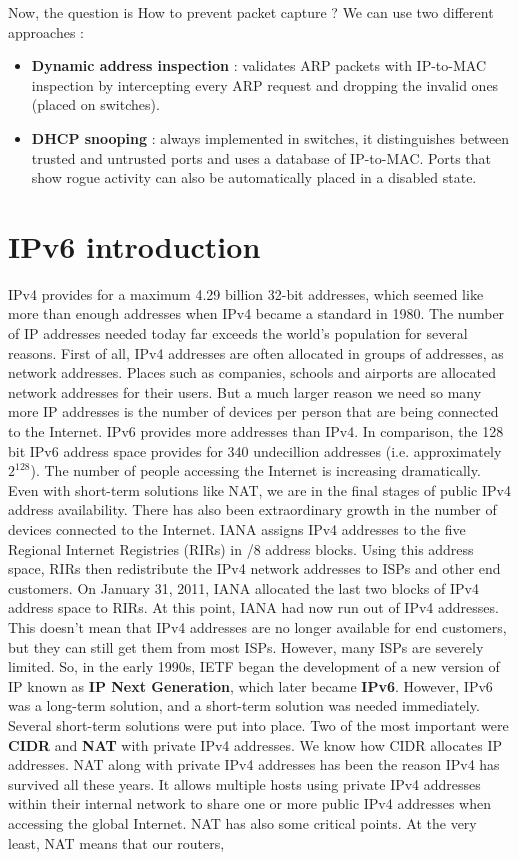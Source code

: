 \documentclass[11pt]{article}
\begin{document}
Now, the question is How to prevent packet capture ? We can use two different approaches :
\begin{itemize}
\item \textbf{Dynamic address inspection} : validates ARP packets with IP-to-MAC inspection by intercepting every ARP request and dropping the invalid ones (placed on switches).
\item \textbf{DHCP snooping} : always implemented in switches, it distinguishes between trusted and untrusted ports and uses a database of IP-to-MAC. Ports that show rogue activity can also be automatically placed in a disabled state.
\end{itemize}
\section{IPv6 introduction}
IPv4 provides for a maximum 4.29 billion 32-bit addresses, which seemed like more than enough addresses when IPv4 became a standard in 1980. The number of IP addresses needed today far exceeds the world's population for several reasons. First of all, IPv4 addresses are often allocated in groups of addresses, as network addresses. Places such as companies, schools and airports are allocated network addresses
for their users. But a much larger reason we need so many more IP addresses is the number of devices per person that are being connected to the Internet. IPv6 provides more addresses than IPv4. In comparison, the 128 bit IPv6 address space provides for 340 undecillion addresses (i.e. approximately $2^{128}$). The number of people accessing the Internet is increasing dramatically. Even with short-term solutions like NAT, we are in the final stages of public IPv4 address availability. There has also been extraordinary growth in the number of devices connected to the Internet. IANA assigns IPv4 addresses to the five Regional Internet Registries (RIRs) in /8 address blocks. Using this address space, RIRs then redistribute the IPv4 network addresses to ISPs and other end customers. On January 31, 2011, IANA allocated the last two blocks of IPv4 address space to RIRs. At this point, IANA had now run out of IPv4 addresses. This doesn't mean that IPv4 addresses are no longer available for end customers, but
they can still get them from most ISPs. However, many ISPs are severely limited. So, in the early 1990s, IETF began the development of a new version of IP known as \textbf{IP Next Generation}, which later became \textbf{IPv6}. However, IPv6 was a long-term solution, and a short-term solution was needed immediately. Several short-term solutions were put into place. Two of the most important were \textbf{CIDR} and \textbf{NAT} with private IPv4 addresses. We know how CIDR allocates IP addresses. NAT along with private IPv4 addresses has been the reason IPv4 has survived all these years. It allows multiple hosts using private IPv4  addresses within their internal network to share one or more public IPv4 addresses when accessing the global Internet. NAT has also some critical points. At the very least, NAT means that our routers,
\end{document}
